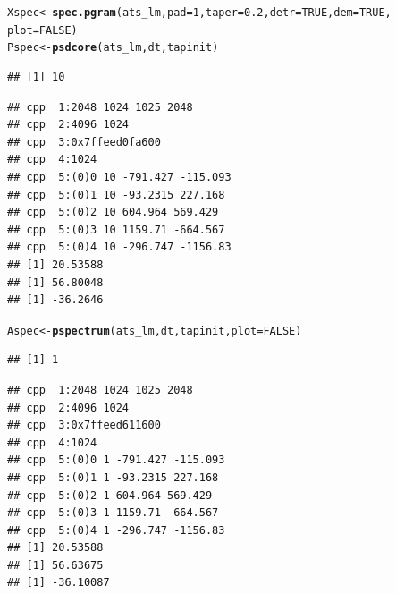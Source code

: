 \documentclass[10pt]{article}\usepackage[]{graphicx}\usepackage[]{color}
\makeatletter
\newcommand{\hlnum}[1]{\textcolor[rgb]{0.686,0.059,0.569}{#1}}%
\newcommand{\hlstd}[1]{\textcolor[rgb]{0.345,0.345,0.345}{#1}}%
\newcommand{\hlkwb}[1]{\textcolor[rgb]{0.69,0.353,0.396}{#1}}%
\newcommand{\hlkwc}[1]{\textcolor[rgb]{0.333,0.667,0.333}{#1}}%
\newcommand{\hlkwd}[1]{\textcolor[rgb]{0.737,0.353,0.396}{\textbf{#1}}}%
\newenvironment{kframe}{%
 \def\at@end@of@kframe{}%
 \ifinner\ifhmode%
  \def\at@end@of@kframe{\end{minipage}}%
  \begin{minipage}{\columnwidth}%
 \fi\fi%
 \def\FrameCommand##1{\hskip\@totalleftmargin \hskip-\fboxsep
 \colorbox{shadecolor}{##1}\hskip-\fboxsep
     \hskip-\linewidth \hskip-\@totalleftmargin \hskip\columnwidth}%
 \MakeFramed {\advance\hsize-\width
   \@totalleftmargin\z@ \linewidth\hsize
   \@setminipage}}%
 {\par\unskip\endMakeFramed%
 \at@end@of@kframe}
\newenvironment{knitrout}{}{} %
\makeatother
\begin{document}
\begin{knitrout}\small
{}\color{fgcolor}\begin{kframe}
\begin{alltt}
\hlstd{Xspec} \hlkwb{<-} \hlkwd{spec.pgram}\hlstd{(ats_lm,} \hlkwc{pad} \hlstd{=} \hlnum{1}\hlstd{,} \hlkwc{taper} \hlstd{=} \hlnum{0.2}\hlstd{,} \hlkwc{detr} \hlstd{=} \hlnum{TRUE}\hlstd{,} \hlkwc{dem} \hlstd{=} \hlnum{TRUE}\hlstd{,}
    \hlkwc{plot} \hlstd{=} \hlnum{FALSE}\hlstd{)}
\hlstd{Pspec} \hlkwb{<-} \hlkwd{psdcore}\hlstd{(ats_lm, dt, tapinit)}
\end{alltt}


{\ttfamily\noindent\itshape\color{messagecolor}{\#\# tap c A 1 1024}}\begin{verbatim}
## [1] 10
\end{verbatim}


{\ttfamily\noindent\itshape\color{messagecolor}{\#\# f creation}}\begin{verbatim}
## cpp  1:2048 1024 1025 2048
## cpp  2:4096 1024
## cpp  3:0x7ffeed0fa600
## cpp  4:1024
## cpp  5:(0)0 10 -791.427 -115.093
## cpp  5:(0)1 10 -93.2315 227.168
## cpp  5:(0)2 10 604.964 569.429
## cpp  5:(0)3 10 1159.71 -664.567
## cpp  5:(0)4 10 -296.747 -1156.83
## [1] 20.53588
## [1] 56.80048
## [1] -36.2646
\end{verbatim}
\begin{alltt}
\hlstd{Aspec} \hlkwb{<-} \hlkwd{pspectrum}\hlstd{(ats_lm, dt, tapinit,} \hlkwc{plot} \hlstd{=} \hlnum{FALSE}\hlstd{)}
\end{alltt}


{\ttfamily\noindent\itshape\color{messagecolor}{\#\# Stage\ \ 0 est. (pilot) \\\#\# 	environment\ \ ** .psdEnv **\ \ refreshed\\\#\# detrending (and demeaning)\\\#\# tap c A 1 1024}}\begin{verbatim}
## [1] 1
\end{verbatim}


{\ttfamily\noindent\itshape\color{messagecolor}{\#\# f creation}}\begin{verbatim}
## cpp  1:2048 1024 1025 2048
## cpp  2:4096 1024
## cpp  3:0x7ffeed611600
## cpp  4:1024
## cpp  5:(0)0 1 -791.427 -115.093
## cpp  5:(0)1 1 -93.2315 227.168
## cpp  5:(0)2 1 604.964 569.429
## cpp  5:(0)3 1 1159.71 -664.567
## cpp  5:(0)4 1 -296.747 -1156.83
## [1] 20.53588
## [1] 56.63675
## [1] -36.10087
\end{verbatim}



\end{kframe}
\end{knitrout}
\end{document}
